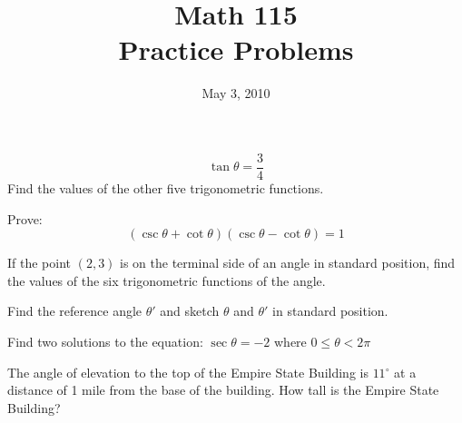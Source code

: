\documentclass[fleqn,addpoints]{exam}
\title{Math 115 \\ Practice Problems}
\date{May 3, 2010}
\newcommand{\degree}{\ensuremath{^\circ}}
\begin{document}
\maketitle

 
\begin{questions}

\question
\[
  \tan \theta = \frac{3}{4}
\]
Find the values of the other five trigonometric functions.

\begin{solution}[3 cm]
\end{solution}


\question
Prove:
\[
  (\csc \theta + \cot \theta)  (\csc \theta - \cot \theta) = 1
\]
\begin{solution}[4 cm]
\end{solution}

\question
If the point $(2, 3)$ is on the terminal side of an angle in standard position, find the values of the six trigonometric
functions of the angle.
\begin{solution}[3 cm]
\end{solution}

\pagebreak

\question
Find the reference angle $\theta'$ and sketch $\theta$ and $\theta'$ in standard position.


\question Find two solutions to the equation: $\sec \theta = -2$ where $0 \leq \theta < 2 \pi$
\begin{solution}[5 cm]
\end{solution}

\question
The angle of elevation to the top of the Empire State Building is $11 \degree$ at a distance of 1 mile from the base of
the building.  How tall is the Empire State Building?
\begin{solution}[4 cm]
\end{solution}


\end{questions}
\end{document}
